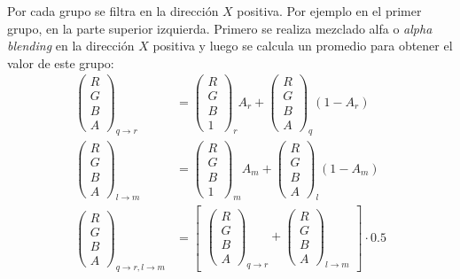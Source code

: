 Por cada grupo se filtra en la dirección $X$ positiva. Por ejemplo en el primer grupo, en la parte superior izquierda. Primero se realiza mezclado alfa o \emph{alpha blending} en la dirección $X$ positiva y luego se calcula un promedio para obtener el valor de este grupo:
\smallskip
\begin{equation}
\begin{split}
	\begin{pmatrix}R\\G\\B\\A\end{pmatrix}_{q \to r} &= 
	\begin{pmatrix}R\\G\\B\\1\end{pmatrix}_{r}A_{r} +
	\begin{pmatrix}R\\G\\B\\A\end{pmatrix}_{q}(1-A_{r})\\
	\begin{pmatrix}R\\G\\B\\A\end{pmatrix}_{l \to m} &= 
	\begin{pmatrix}R\\G\\B\\1\end{pmatrix}_{m}A_{m} +
	\begin{pmatrix}R\\G\\B\\A\end{pmatrix}_{l}(1-A_{m})\\
	\begin{pmatrix}R\\G\\B\\A\end{pmatrix}_{q \to r, l \to m} &= 
	\begin{bmatrix}
	\begin{pmatrix}R\\G\\B\\A\end{pmatrix}_{q \to r} +
	\begin{pmatrix}R\\G\\B\\A\end{pmatrix}_{l \to m}
	\end{bmatrix}\cdot 0.5
\end{split}
\end{equation}

